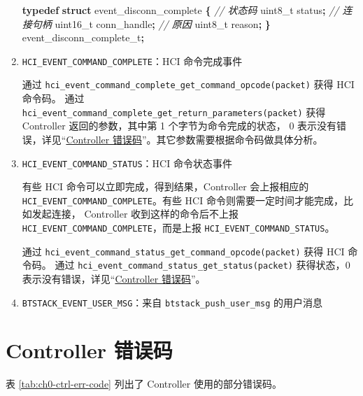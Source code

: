 \documentclass[
  12pt,
]{book}
\newenvironment{Shaded}{\begin{snugshade}}{\end{snugshade}}
\newcommand{\CommentTok}[1]{\textcolor[rgb]{0.56,0.35,0.01}{\textit{#1}}}
\newcommand{\DataTypeTok}[1]{\textcolor[rgb]{0.13,0.29,0.53}{#1}}
\newcommand{\KeywordTok}[1]{\textcolor[rgb]{0.13,0.29,0.53}{\textbf{#1}}}
\newcommand{\NormalTok}[1]{#1}
\newcommand{\OperatorTok}[1]{\textcolor[rgb]{0.81,0.36,0.00}{\textbf{#1}}}
\begin{document}
\begin{enumerate}
\begin{Shaded}
\begin{Highlighting}[]
\KeywordTok{typedef} \KeywordTok{struct}\NormalTok{ event\_disconn\_complete}
\OperatorTok{\{}
    \CommentTok{// 状态码}
    \DataTypeTok{uint8\_t}\NormalTok{ status}\OperatorTok{;}
    \CommentTok{// 连接句柄}
    \DataTypeTok{uint16\_t}\NormalTok{ conn\_handle}\OperatorTok{;}
    \CommentTok{// 原因}
    \DataTypeTok{uint8\_t}\NormalTok{ reason}\OperatorTok{;}
\OperatorTok{\}}\NormalTok{ event\_disconn\_complete\_t}\OperatorTok{;}
\end{Highlighting}
\end{Shaded}
\item
  \texttt{HCI\_EVENT\_COMMAND\_COMPLETE}：HCI 命令完成事件

  通过 \texttt{hci\_event\_command\_complete\_get\_command\_opcode(packet)} 获得 HCI 命令码。
  通过 \texttt{hci\_event\_command\_complete\_get\_return\_parameters(packet)} 获得 Controller 返回的参数，其中第 1 个字节为命令完成的状态，
  \(0\) 表示没有错误，详见``\protect\hyperlink{ch-ctrl-err-code}{Controller 错误码}''。其它参数需要根据命令码做具体分析。
\item
  \texttt{HCI\_EVENT\_COMMAND\_STATUS}：HCI 命令状态事件

  有些 HCI 命令可以立即完成，得到结果，Controller 会上报相应的 \texttt{HCI\_EVENT\_COMMAND\_COMPLETE}。有些 HCI 命令则需要一定时间才能完成，比如发起连接，
  Controller 收到这样的命令后不上报 \texttt{HCI\_EVENT\_COMMAND\_COMPLETE}，而是上报 \texttt{HCI\_EVENT\_COMMAND\_STATUS}。

  通过 \texttt{hci\_event\_command\_status\_get\_command\_opcode(packet)} 获得 HCI 命令码。
  通过 \texttt{hci\_event\_command\_status\_get\_status(packet)} 获得状态，\(0\) 表示没有错误，详见``\protect\hyperlink{ch-ctrl-err-code}{Controller 错误码}''。
\item
  \texttt{BTSTACK\_EVENT\_USER\_MSG}：来自 \texttt{btstack\_push\_user\_msg} 的用户消息
\end{enumerate}

\hypertarget{ch-ctrl-err-code}{%
\section{Controller 错误码}\label{ch-ctrl-err-code}}

表 \ref{tab:ch0-ctrl-err-code} 列出了 Controller 使用的部分错误码。
\end{document}
